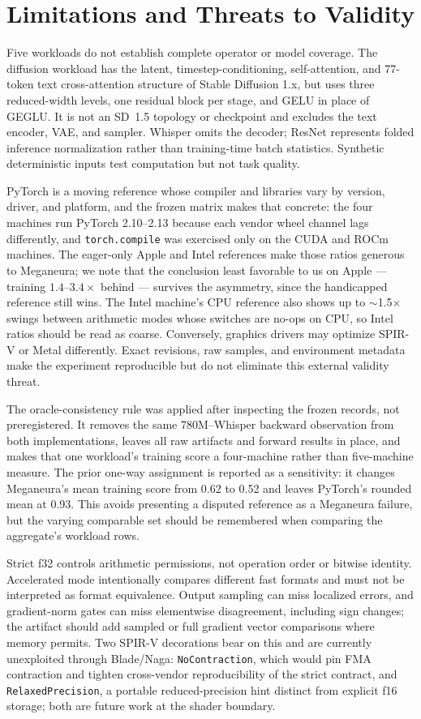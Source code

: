 \documentclass[10pt,twocolumn]{article}
\newcommand{\system}{Meganeura}
\newcommand{\code}[1]{\texttt{#1}}
\begin{document}
\section{Limitations and Threats to Validity}

Five workloads do not establish complete operator or model coverage. The
diffusion workload has the latent, timestep-conditioning, self-attention, and
77-token text cross-attention structure of Stable Diffusion 1.x, but uses
three reduced-width levels, one residual block per stage, and GELU in place of
GEGLU. It is not an SD~1.5 topology or checkpoint and excludes the text
encoder, VAE, and sampler. Whisper omits the decoder; ResNet represents folded
inference normalization rather than training-time batch statistics.
Synthetic deterministic inputs test computation but not task quality.

PyTorch is a moving reference whose compiler and libraries vary by version,
driver, and platform, and the frozen matrix makes that concrete: the four
machines run PyTorch 2.10--2.13 because each vendor wheel channel lags
differently, and \code{torch.compile} was exercised only on the CUDA and
ROCm machines. The eager-only Apple and Intel references make those ratios
generous to \system{}; we note that the conclusion least favorable to us on
Apple --- training $1.4$--$3.4\times$ behind --- survives the asymmetry,
since the handicapped reference still wins. The Intel machine's CPU
reference also shows up to $\sim$1.5$\times$ swings between arithmetic modes
whose switches are no-ops on CPU, so Intel ratios should be read as coarse.
Conversely, graphics drivers may optimize SPIR-V or Metal differently. Exact
revisions, raw samples, and environment metadata make the experiment
reproducible but do not eliminate this external validity threat.

The oracle-consistency rule was applied after inspecting the frozen records,
not preregistered. It removes the same 780M--Whisper backward observation
from both implementations, leaves all raw artifacts and forward results in
place, and makes that one workload's training score a four-machine rather
than five-machine measure. The prior one-way assignment is reported as a
sensitivity: it changes \system{}'s mean training score from 0.62 to 0.52
and leaves PyTorch's rounded mean at 0.93. This avoids presenting a disputed
reference as a \system{} failure, but the varying comparable set should be
remembered when comparing the aggregate's workload rows.

Strict f32 controls arithmetic permissions, not operation order or bitwise
identity. Accelerated mode intentionally compares different fast formats and
must not be interpreted as format equivalence. Output sampling can miss
localized errors, and gradient-norm gates can miss elementwise disagreement,
including sign changes; the artifact should add sampled or full gradient
vector comparisons where memory permits. Two SPIR-V decorations bear on
this and are currently unexploited through Blade/Naga:
\code{NoContraction}, which would pin FMA contraction and tighten
cross-vendor reproducibility of the strict contract, and
\code{RelaxedPrecision}, a portable reduced-precision hint distinct from
explicit f16 storage; both are future work at the shader boundary.
\end{document}
